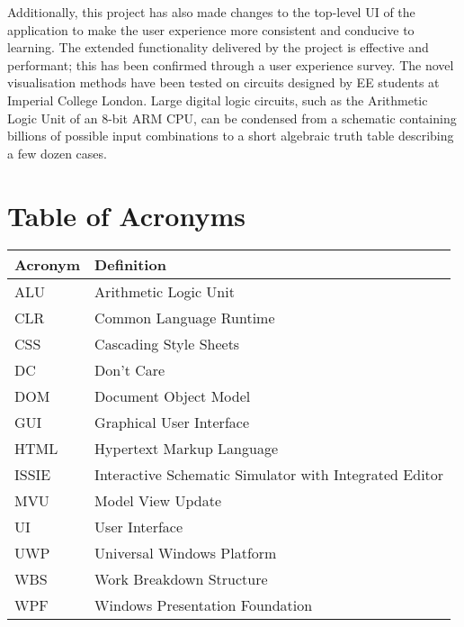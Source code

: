 Additionally, this project has also made changes to the top-level UI of the application to make the user experience more consistent and conducive to learning.
The extended functionality delivered by the project is effective and performant; this has been confirmed through a user experience survey. The novel visualisation methods have been tested on circuits designed by EE students at Imperial College London. Large digital logic circuits, such as the Arithmetic Logic Unit of an 8-bit ARM CPU, can be condensed from a schematic containing billions of possible input combinations to a short algebraic truth table describing a few dozen cases. 

\newpage

\tableofcontents

\listoftables

\listoffigures

\newpage
\chapter*{Table of Acronyms}

\begin{table}[!ht]
    \centering
    \begin{tabular}{|l|l|}
    \hline
        \textbf{Acronym} & \textbf{Definition} \\ \hline
        ALU & Arithmetic Logic Unit \\ \hline
        CLR & Common Language Runtime \\ \hline
        CSS & Cascading Style Sheets \\ \hline
        DC & Don't Care \\ \hline
        DOM & Document Object Model \\ \hline
        GUI & Graphical User Interface \\ \hline
        HTML & Hypertext Markup Language \\ \hline
        ISSIE & Interactive Schematic Simulator with Integrated Editor \\ \hline
        MVU & Model View Update \\ \hline
        UI & User Interface \\ \hline
        UWP  & Universal Windows Platform \\ \hline
        WBS & Work Breakdown Structure \\ \hline
        WPF & Windows Presentation Foundation \\ \hline
    \end{tabular}
\end{table}